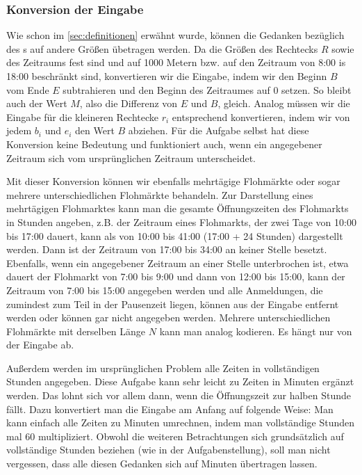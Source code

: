 \subsubsection{Konversion der Eingabe}
Wie schon im \cref{sec:definitionen} erwähnt wurde, können die Gedanken bezüglich des
\fp s auf andere Größen übetragen werden. Da die Größen des Rechtecks $R$ sowie des Zeitraums fest sind
und auf 1000 Metern bzw. auf den Zeitraum von 8:00 is 18:00 beschränkt sind, konvertieren wir
die Eingabe, indem wir den 
Beginn $B$ vom Ende $E$ subtrahieren und den Beginn des Zeitraumes auf 0 setzen.
So bleibt auch der Wert $M$, also die Differenz von $E$ und $B$, gleich. 
Analog müssen wir die Eingabe für die kleineren Rechtecke $r_i$ entsprechend konvertieren, indem wir
von jedem $b_i$ und $e_i$ den Wert $B$ abziehen. Für die Aufgabe selbst hat diese Konversion keine
Bedeutung und funktioniert auch, wenn ein angegebener Zeitraum sich vom ursprünglichen Zeitraum unterscheidet.

Mit dieser Konversion können wir ebenfalls mehrtägige Flohmärkte oder
sogar mehrere unterschiedlichen Flohmärkte behandeln.
Zur Darstellung eines mehrtägigen Flohmarktes kann man die gesamte Öffnungszeiten des Flohmarkts in Stunden angeben,
z.B. der Zeitraum eines Flohmarkts, der zwei Tage von 10:00 bis 17:00 dauert,
kann als von 10:00 bis 41:00 (17:00 + 24 Stunden) dargestellt werden. 
Dann ist der Zeitraum von 17:00 bis 34:00 an keiner Stelle besetzt.
Ebenfalls, wenn ein angegebener Zeitraum an einer Stelle unterbrochen ist,
etwa dauert der Flohmarkt von 7:00 bis 9:00 und dann von 12:00 bis 15:00, kann der
Zeitraum von 7:00 bis 15:00 angegeben werden und alle Anmeldungen, die zumindest zum Teil
in der Pausenzeit liegen, können aus der Eingabe entfernt werden oder können gar nicht
angegeben werden.
Mehrere unterschiedlichen Flohmärkte mit derselben Länge $N$ kann man analog kodieren.
Es hängt nur von der Eingabe ab.


Außerdem werden im ursprünglichen Problem alle Zeiten in vollständigen Stunden angegeben.
Diese Aufgabe kann sehr leicht zu Zeiten in Minuten ergänzt werden.
Das lohnt sich vor allem dann, wenn die Öffnungszeit zur halben Stunde fällt.
Dazu konvertiert man die Eingabe
am Anfang auf folgende Weise: Man kann einfach alle Zeiten zu Minuten umrechnen, indem
man vollständige Stunden mal 60 multipliziert.
Obwohl die weiteren Betrachtungen sich grundsätzlich auf vollständige Stunden beziehen
(wie in der Aufgabenstellung),
soll man nicht vergessen, dass alle diesen Gedanken sich auf Minuten übertragen lassen.